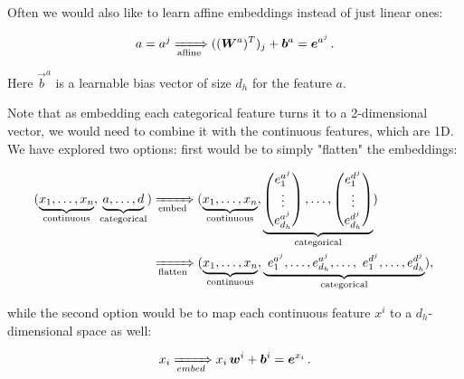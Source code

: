 Often we would also like to learn affine embeddings instead of just linear ones:

\begin{equation}
    a = a^j \xRightarrow[\text{affine}]{} ((\vec{W}^a)^T)_j + \vec{b}^a = \vec{e}^{a^j}\,.
\end{equation}

Here $\vec{b}^a$ is a learnable bias vector of size $d_h$ for the feature $a$.

Note that as embedding each categorical feature turns it to a 2-dimensional vector, we would need to combine it
with the continuous features, which are 1D. We have explored two options: first would be to simply "flatten" the
embeddings:

\begin{align}
    (\underbrace{x_1, \dots, x_n}_\text{continuous},
    \underbrace{a, \dots, d}_\text{categorical})
     & \xRightarrow[\text{embed}]{}
    (\underbrace{x_1, \dots, x_n}_\text{continuous},
    \underbrace{\begin{pmatrix}
                        e^{a^j}_1 \\ \vdots \\ e^{a^j}_{d_h}
                    \end{pmatrix}, \dots,
    \begin{pmatrix}
            e^{d^j}_1 \\ \vdots \\ e^{d^j}_{d_h}
        \end{pmatrix}}_\text{categorical}) \\
     & \xRightarrow[\text{flatten}]{}
    (\underbrace{x_1, \dots, x_n}_\text{continuous},
    \underbrace{\,\, e^{a^j}_1,\dots, e^{a^j}_{d_h}, \dots,
        \,\, e^{d^j}_1, \dots, e^{d^j}_{d_h}}_\text{categorical}),\,
\end{align}

while the second option would be to map each continuous feature $x^i$ to a $d_h$-dimensional space as well:

\begin{equation}
    x_i \xRightarrow[embed]{} x_i \, \vec{w}^i + \vec{b}^i = \vec{e}^{x_i}\,.
\end{equation}

